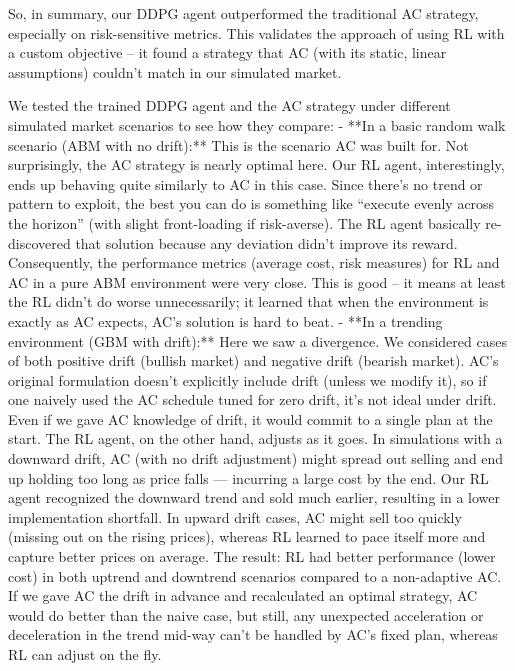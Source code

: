 \documentclass[11pt]{article}
\begin{document}
		So, in summary, our DDPG agent outperformed the traditional AC strategy, especially on risk-sensitive metrics. This validates the approach of using RL with a custom objective – it found a strategy that AC (with its static, linear assumptions) couldn’t match in our simulated market.
	
	
	
		We tested the trained DDPG agent and the AC strategy under different simulated market scenarios to see how they compare:
		- **In a basic random walk scenario (ABM with no drift):** This is the scenario AC was built for. Not surprisingly, the AC strategy is nearly optimal here. Our RL agent, interestingly, ends up behaving quite similarly to AC in this case. Since there’s no trend or pattern to exploit, the best you can do is something like “execute evenly across the horizon” (with slight front-loading if risk-averse). The RL agent basically re-discovered that solution because any deviation didn’t improve its reward. Consequently, the performance metrics (average cost, risk measures) for RL and AC in a pure ABM environment were very close. This is good – it means at least the RL didn’t do worse unnecessarily; it learned that when the environment is exactly as AC expects, AC’s solution is hard to beat.
		- **In a trending environment (GBM with drift):** Here we saw a divergence. We considered cases of both positive drift (bullish market) and negative drift (bearish market). AC’s original formulation doesn’t explicitly include drift (unless we modify it), so if one naively used the AC schedule tuned for zero drift, it’s not ideal under drift. Even if we gave AC knowledge of drift, it would commit to a single plan at the start. The RL agent, on the other hand, adjusts as it goes. In simulations with a downward drift, AC (with no drift adjustment) might spread out selling and end up holding too long as price falls — incurring a large cost by the end. Our RL agent recognized the downward trend and sold much earlier, resulting in a lower implementation shortfall. In upward drift cases, AC might sell too quickly (missing out on the rising prices), whereas RL learned to pace itself more and capture better prices on average. The result: RL had better performance (lower cost) in both uptrend and downtrend scenarios compared to a non-adaptive AC. If we gave AC the drift in advance and recalculated an optimal strategy, AC would do better than the naive case, but still, any unexpected acceleration or deceleration in the trend mid-way can’t be handled by AC’s fixed plan, whereas RL can adjust on the fly.
\end{document}
